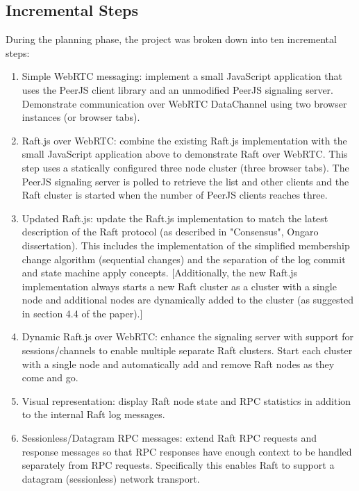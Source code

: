 \documentclass{acmtog} %
\begin{document}
\subsection{Incremental Steps}

During the planning phase, the project was broken down into ten incremental steps:

\begin{enumerate}
\item Simple WebRTC messaging: implement a small JavaScript application that uses the PeerJS client library and an unmodified PeerJS signaling server. Demonstrate communication over WebRTC DataChannel using two browser instances (or browser tabs).

\item Raft.js over WebRTC: combine the existing Raft.js implementation with the small JavaScript application above to demonstrate Raft over WebRTC. This step uses a statically configured three node cluster (three browser tabs). The PeerJS signaling server is polled to retrieve the list and other clients and the Raft cluster is started when the number of PeerJS clients reaches three.

\item Updated Raft.js: update the Raft.js implementation to match the latest description of the Raft protocol (as described in "Consensus", Ongaro dissertation). This includes the implementation of the simplified membership change algorithm (sequential changes) and the separation of the log commit and state machine apply concepts. [Additionally, the new Raft.js implementation always starts a new Raft cluster as a cluster with a single node and additional nodes are dynamically added to the cluster (as suggested in section 4.4 of the paper).]

\item Dynamic Raft.js over WebRTC: enhance the signaling server with support for sessions/channels to enable multiple separate Raft clusters. Start each cluster with a single node and automatically add and remove Raft nodes as they come and go.

\item Visual representation: display Raft node state and RPC statistics in addition to the internal Raft log messages.

\item Sessionless/Datagram RPC messages: extend Raft RPC requests and response messages so that RPC responses have enough context to be handled separately from RPC requests. Specifically this enables Raft to support a datagram (sessionless) network transport.


\end{enumerate}
\end{document}
